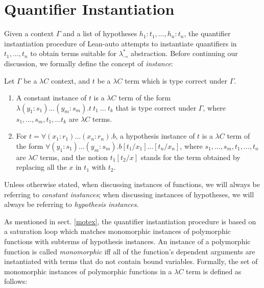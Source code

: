 \section{Quantifier Instantiation}\label{sectinst}
Given a context $\Gamma$ and a list of hypotheses $h_1 : t_1, \dots, h_n : t_n$, the quantifier
instantiation procedure of Lean-auto attempts to instantiate quantifiers in
$t_1, \dots, t_n$ to obtain terms suitable for $\lambda_\to^*$ abstraction.
Before continuing our discussion, we formally define the concept of \textit{instance}:

\begin{definition}
  Let $\Gamma$ be a $\lambda C$ context, and $t$ be a $\lambda C$ term which is type correct under $\Gamma$.
  \begin{enumerate}
    \item A constant instance of $t$ is a $\lambda C$ term of the
      form $\lambda (y_1 : s_1) \dots (y_m : s_m). t \ t_1 \ \dots \ t_k$ that is
      type correct under $\Gamma$, where $s_1, \dots, s_m, t_1, \dots t_k$ are $\lambda C$ terms.
    \item For $t = \forall (x_1 : r_1) \dots (x_n : r_n). b$, a hypothesis instance of
      $t$ is a $\lambda C$ term of the form $\forall (y_1 : s_1) \dots (y_m : s_m). b[t_1/x_1]\dots[t_n/x_n]$,
      where $s_1, \dots, s_m, t_1, \dots, t_n$ are $\lambda C$ terms, and the notion $t_1[t_2/x]$ stands
      for the term obtained by replacing all the $x$ in $t_1$ with $t_2$.
  \end{enumerate}
\end{definition}

Unless otherwise stated, when discussing instances of functions, we will always be
referring to \textit{constant instances}; when discussing instances of hypotheses, we will
always be referring to \textit{hypothesis instances}.

As mentioned in sect. \ref{motex}, the quantifier instantiation procedure
is based on a saturation loop which matches monomorphic instances of polymorphic functions
with subterms of hypothesis instances. An instance of a polymorphic function is called
\textit{monomorphic} iff all of the function's dependent arguments are instantiated with terms
that do not contain bound variables. Formally, the set of monomorphic instances of polymorphic
functions in a $\lambda C$ term is defined as follows:

